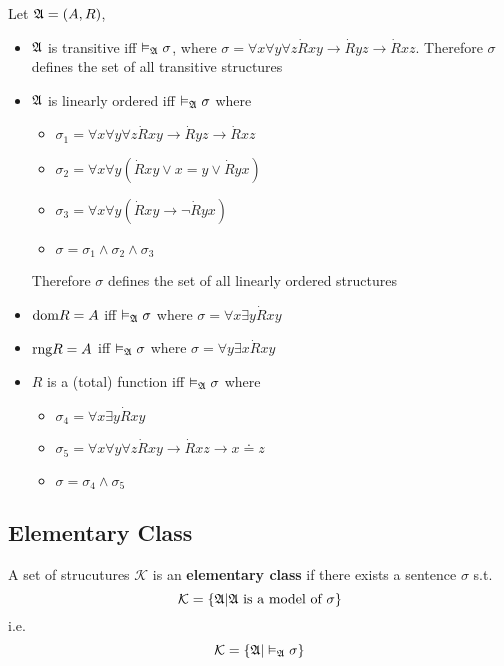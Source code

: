 Let $\mathfrak{A} = (A,R)$,
\begin{itemize}
    \item $\mathfrak{A}$ is transitive iff $\vDash_{\mathfrak{A}}\sigma$, where $\sigma=\forall x \forall y \forall z \dot{R}xy \to \dot{R}yz \to \dot{R}xz$. Therefore $\sigma$ defines the set of all transitive structures
    \item $\mathfrak{A}$ is linearly ordered iff $\vDash_{\mathfrak{A}}\sigma$ where
    \begin{itemize}
        \item $\sigma_1 = \forall x \forall y \forall z \dot{R}xy \to \dot{R}yz \to \dot{R}xz$
        \item $\sigma_2 = \forall x \forall y (\dot{R}xy \vee x=y \vee \dot{R}yx)$
        \item $\sigma_3 = \forall x \forall y (\dot{R}xy \to \neg\dot{R}yx)$
        \item $\sigma = \sigma_1 \wedge \sigma_2 \wedge \sigma_3$
    \end{itemize}
    Therefore $\sigma$ defines the set of all linearly ordered structures
    \item $\textrm{dom}{R} = A$ iff $\vDash_{\mathfrak{A}}\sigma$ where $\sigma = \forall x \exists y \dot{R}xy$
    \item $\textrm{rng}{R} = A$ iff $\vDash_{\mathfrak{A}}\sigma$ where $\sigma = \forall y \exists x \dot{R}xy$
    \item $R$ is a (total) function iff $\vDash_{\mathfrak{A}}\sigma$ where
    \begin{itemize}
        \item $\sigma_4 =  \forall x \exists y \dot{R}xy$
        \item $\sigma_5 = \forall x \forall y \forall z \dot{R}xy \to \dot{R}xz \to x \doteq z$
        \item $\sigma = \sigma_4 \wedge \sigma_5$
    \end{itemize}
\end{itemize}

\subsection{Elementary Class}

\begin{definition}
    A set of strucutures $\mathcal{K}$ is an \textbf{elementary class} if there exists a sentence $\sigma$ s.t.
    \[ \mathcal{K} = \{ \mathfrak{A} | \mathfrak{A} \text{ is a model of $\sigma$} \} \]
    i.e.
    \[ \mathcal{K} = \{ \mathfrak{A} | \vDash_{\mathfrak{A}}\sigma \} \]
\end{definition}

